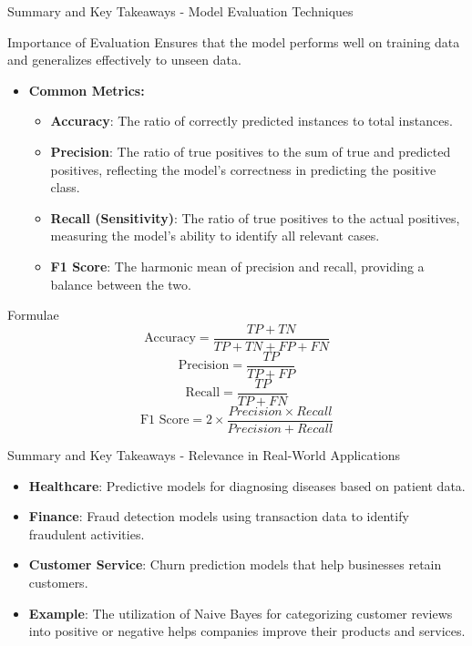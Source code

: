 \documentclass[aspectratio=169]{beamer}
\begin{document}
\begin{frame}[fragile]{Summary and Key Takeaways - Model Evaluation Techniques}
    \begin{block}{Importance of Evaluation}
        Ensures that the model performs well on training data and generalizes effectively to unseen data.
    \end{block}
    \begin{itemize}
        \item \textbf{Common Metrics:}
        \begin{itemize}
            \item \textbf{Accuracy}: The ratio of correctly predicted instances to total instances.
            \item \textbf{Precision}: The ratio of true positives to the sum of true and predicted positives, reflecting the model's correctness in predicting the positive class.
            \item \textbf{Recall (Sensitivity)}: The ratio of true positives to the actual positives, measuring the model's ability to identify all relevant cases.
            \item \textbf{F1 Score}: The harmonic mean of precision and recall, providing a balance between the two.
        \end{itemize}
    \end{itemize}
    \begin{block}{Formulae}
        \begin{equation}
        \text{Accuracy} = \frac{TP + TN}{TP + TN + FP + FN}
        \end{equation}
        \begin{equation}
        \text{Precision} = \frac{TP}{TP + FP}
        \end{equation}
        \begin{equation}
        \text{Recall} = \frac{TP}{TP + FN}
        \end{equation}
        \begin{equation}
        \text{F1 Score} = 2 \times \frac{Precision \times Recall}{Precision + Recall}
        \end{equation}
    \end{block}
\end{frame}

\begin{frame}[fragile]{Summary and Key Takeaways - Relevance in Real-World Applications}
    \begin{itemize}
        \item \textbf{Healthcare}: Predictive models for diagnosing diseases based on patient data.
        \item \textbf{Finance}: Fraud detection models using transaction data to identify fraudulent activities.
        \item \textbf{Customer Service}: Churn prediction models that help businesses retain customers.
        \item \textbf{Example}: The utilization of Naive Bayes for categorizing customer reviews into positive or negative helps companies improve their products and services.
    \end{itemize}
\end{frame}
\end{document}
